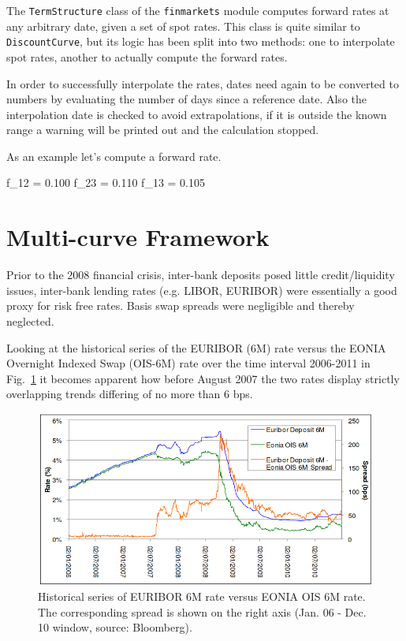 \begin{finmarkets}
The \texttt{TermStructure} class of the \texttt{finmarkets} module computes forward rates at any arbitrary date, given a set of spot rates. This class is quite similar to \texttt{DiscountCurve}, but its logic has been split into two methods: one to interpolate spot rates, another to actually compute the forward rates.

In order to successfully interpolate the rates, dates need again to be converted to numbers by evaluating the number of days since a reference date. Also the interpolation date is checked to avoid extrapolations, if it is outside the known range a warning will be printed out and the calculation stopped.
\end{finmarkets}


As an example let's compute a forward rate.


\begin{ioutput}
f_12 = 0.100
f_23 = 0.110
f_13 = 0.105
\end{ioutput}

\section{Multi-curve Framework}
\label{sec:financial-crisis}


Prior to the 2008 financial crisis, inter-bank deposits posed little credit/liquidity issues, inter-bank lending rates (e.g. LIBOR, EURIBOR) were essentially a good proxy for risk free rates. Basis swap spreads were negligible and thereby neglected. 

Looking at the historical series of the EURIBOR (6M) rate versus the EONIA Overnight Indexed Swap (OIS-6M) rate over the time interval 2006-2011 in Fig.~\ref{fig:credit_crunch} it becomes apparent how before August 2007 the two rates display strictly overlapping trends differing of no more than 6 bps.

\begin{figure}[htb]
	\centering
	\includegraphics[width=0.9\linewidth]{figures/credit_crunch.png}
	\caption{Historical series of EURIBOR 6M rate versus EONIA OIS 6M rate. The corresponding spread 
		is shown on the right axis (Jan. 06 - Dec. 10 window, source: Bloomberg).}
	\label{fig:credit_crunch}
\end{figure}

